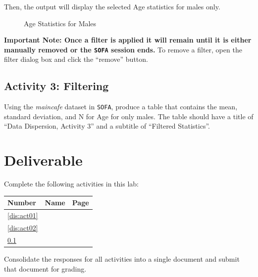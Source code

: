 Then, the output will display the selected Age statistics for males only.

\begin{figure}[H]
  \begin{center}
    \caption{Age Statistics for Males}
  \end{center}
\end{figure}

\textbf{Important Note: Once a filter is applied it will remain until it is either manually removed or the \texttt{SOFA} session ends.} To remove a filter, open the filter dialog box and click the ``remove'' button.

\subsection{Activity 3: Filtering} \label{dis:act03}

Using the \textit{maincafe} dataset in \texttt{SOFA}, produce a table that contains the mean, standard deviation, and N for Age for only males. The table should have a title of ``Data Dispersion, Activity 3'' and a subtitle of ``Filtered Statistics''.

\section{Deliverable}

Complete the following activities in this lab:

\begin{center}
  \begin{tabular}{lll}
    \hline 
    \textbf{Number} & \textbf{Name} & \textbf{Page} \\ 
    \hline 
    \ref{dis:act01} & \nameref{dis:act01} & \pageref{dis:act01} \\ 
    \ref{dis:act02} & \nameref{dis:act02} & \pageref{dis:act02} \\ 
    \ref{dis:act03} & \nameref{dis:act03} & \pageref{dis:act03} \\ 
    \hline 
  \end{tabular} 
\end{center}

Consolidate the responses for all activities into a single document and submit that document for grading.
